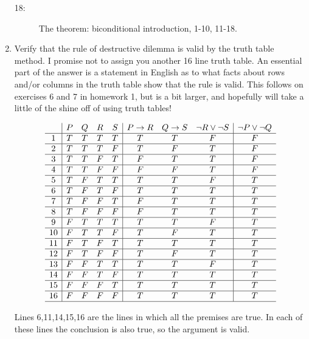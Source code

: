 \documentclass[12pt]{article}
\begin{document}
\begin{enumerate}
\begin{description}
\item[18:]  The theorem:  biconditional introduction, 1-10, 11-18.

\end{description}

\newpage

\item  Verify that the rule of destructive dilemma is valid by the truth table method.  I promise not to assign you another 16 line truth table.  An essential part of the answer is a statement in English as to what facts about
rows and/or columns in the truth table show that the rule is valid.   This follows on exercises 6 and 7 in homework 1, but is a bit larger, and hopefully will take a little of the shine off of using truth tables!

$$\begin{array}{c|cccc|ccc|c}

& P & Q & R & S & P \rightarrow R & Q \rightarrow S & \neg R \vee \neg S & \neg P \vee \neg Q \\ \hline

1& T& T & T & T & T & T & F & F\\ \hline
2& T& T & T & F & T & F & T & F\\ \hline
3& T& T & F& T & F & T & T & F\\ \hline
4& T& T & F & F & F& F & T & F\\ \hline
5& T& F& T & T & T & T & F & T\\ \hline
6& T& F & T & F & T & T & T & T\\ \hline
7& T& F & F & T & F & T & T & T\\ \hline
8& T& F & F & F & F& T & T & T\\ \hline
9& F& T & T & T & T & T & F & T\\ \hline
10& F& T & T & F & T & F & T & T\\ \hline
11& F& T & F & T & T & T & T & T\\ \hline
12& F& T & F & F & T & F & T & T\\ \hline
13& F& F & T & T & T & T & F & T\\ \hline
14& F& F & T & F & T & T & T & T\\ \hline
15& F& F & F & T & T & T & T & T\\ \hline
16& F& F & F & F & T & T & T & T\\ \hline

\end{array}$$

Lines 6,11,14,15,16 are the lines in which all the premises are true.  In each of these lines the conclusion is also true, so the argument is valid.

\end{enumerate}
\end{document}

